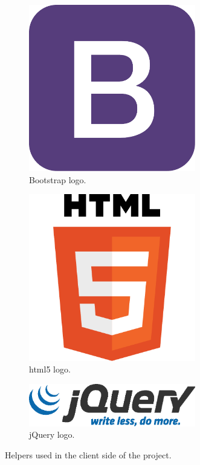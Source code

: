 \begin{figure}[!htbp]
	\centering
	\begin{subfigure}{0.25\textwidth}
		\centering
		\includegraphics[width=0.8\textwidth]{fig/bootstrap}
		\caption{Bootstrap logo.}\label{subfig:bootstrap}
	\end{subfigure}\quad
	\begin{subfigure}{0.25\textwidth}
		\centering
		\includegraphics[width=0.8\textwidth]{fig/html5}
		\caption{\acrshort{html}5 logo.}\label{subfig:html5}
	\end{subfigure}\quad
	\begin{subfigure}{0.4\textwidth}
		\centering
		\includegraphics[width=0.8\textwidth]{fig/jquery}
		\caption{jQuery logo.}\label{subfig:jquery}
	\end{subfigure}\quad
	\caption{Helpers used in the client side of the project.}
\end{figure}

